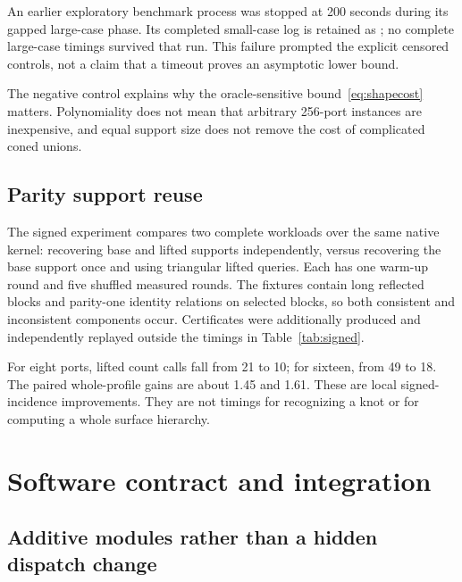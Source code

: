 \documentclass[11pt,letterpaper]{article}
\theoremstyle{definition}\newtheorem{definition}[theorem]{Definition}
\theoremstyle{remark}\newtheorem{remark}[theorem]{Remark}
\begin{document}
An earlier exploratory benchmark process was stopped at 200 seconds during its gapped large-case phase. Its completed small-case log is retained as ; no complete large-case timings survived that run. This failure prompted the explicit censored controls, not a claim that a timeout proves an asymptotic lower bound.

The negative control explains why the oracle-sensitive bound~\eqref{eq:shapecost} matters. Polynomiality does not mean that arbitrary 256-port instances are inexpensive, and equal support size does not remove the cost of complicated coned unions.

\subsection{Parity support reuse}

The signed experiment compares two complete workloads over the same native kernel: recovering base and lifted supports independently, versus recovering the base support once and using triangular lifted queries. Each has one warm-up round and five shuffled measured rounds. The fixtures contain long reflected blocks and parity-one identity relations on selected blocks, so both consistent and inconsistent components occur. Certificates were additionally produced and independently replayed outside the timings in Table~\ref{tab:signed}.

\begin{table}[H]
\centering\footnotesize

\caption{Signed-profile query times without certificates. The cover-query columns isolate the saved second support search. Both arms include the base computation.}
\label{tab:signed}
\end{table}

For eight ports, lifted count calls fall from 21 to 10; for sixteen, from 49 to 18. The paired whole-profile gains are about 1.45 and 1.61. These are local signed-incidence improvements. They are not timings for recognizing a knot or for computing a whole surface hierarchy.

\section{Software contract and integration}
\label{sec:integration}

\subsection{Additive modules rather than a hidden dispatch change}
\end{document}
